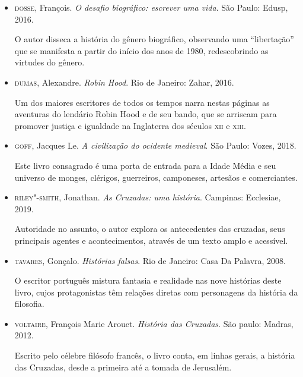 \documentclass[12pt]{extarticle}
\begin{document}
\begin{itemize}

\item \textsc{dosse}, François. \textit{O desafio biográfico: escrever uma vida}. São
Paulo: Edusp, 2016.

O autor disseca a história do gênero biográfico, observando uma
``libertação'' que se manifesta a partir do início dos anos de 1980,
redescobrindo as virtudes do gênero.

\item \textsc{dumas}, Alexandre. \textit{Robin Hood}. Rio de Janeiro: Zahar, 2016.

Um dos maiores escritores de todos os tempos narra nestas páginas as
aventuras do lendário Robin Hood e de seu bando, que se arriscam para
promover justiça e igualdade na Inglaterra dos séculos \textsc{xii} e \textsc{xiii}.

\item \textsc{goff}, Jacques Le. \textit{A civilização do ocidente medieval}. São Paulo:
Vozes, 2018.

Este livro consagrado é uma porta de entrada para a Idade Média e seu
universo de monges, clérigos, guerreiros, camponeses, artesãos e
comerciantes.

\item \textsc{riley"-smith}, Jonathan. \textit{As Cruzadas: uma história}. Campinas:
Ecclesiae, 2019.

Autoridade no assunto, o autor explora os antecedentes das cruzadas,
seus principais agentes e acontecimentos, através de um texto amplo e
acessível.

\item \textsc{tavares}, Gonçalo. \textit{Histórias falsas}. Rio de Janeiro: Casa Da
Palavra, 2008.

O escritor português mistura fantasia e realidade nas nove histórias
deste livro, cujos protagonistas têm relações diretas com personagens da
história da filosofia.

\item \textsc{voltaire}, François Marie Arouet. \textit{História das Cruzadas}. São paulo: Madras, 2012.

Escrito pelo célebre filósofo francês, o livro conta, em linhas gerais,
a história das Cruzadas, desde a primeira até a tomada de Jerusalém.

\end{itemize}
\end{document}
